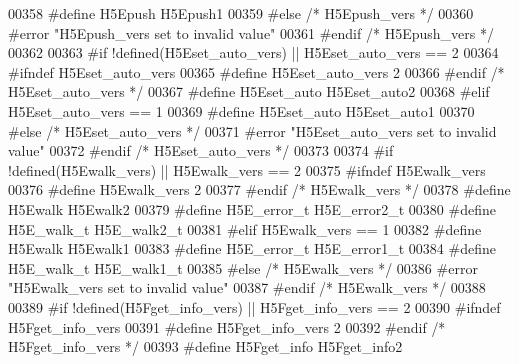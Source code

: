 \begin{DoxyCode}
00358 \textcolor{preprocessor}{  #define H5Epush H5Epush1}
00359 \textcolor{preprocessor}{#else }\textcolor{comment}{/* H5Epush\_vers */}\textcolor{preprocessor}{}
00360 \textcolor{preprocessor}{  #error "H5Epush\_vers set to invalid value"}
00361 \textcolor{preprocessor}{#endif }\textcolor{comment}{/* H5Epush\_vers */}\textcolor{preprocessor}{}
00362 
00363 \textcolor{preprocessor}{#if !defined(H5Eset\_auto\_vers) || H5Eset\_auto\_vers == 2}
00364 \textcolor{preprocessor}{  #ifndef H5Eset\_auto\_vers}
00365 \textcolor{preprocessor}{    #define H5Eset\_auto\_vers 2}
00366 \textcolor{preprocessor}{  #endif }\textcolor{comment}{/* H5Eset\_auto\_vers */}\textcolor{preprocessor}{}
00367 \textcolor{preprocessor}{  #define H5Eset\_auto H5Eset\_auto2}
00368 \textcolor{preprocessor}{#elif H5Eset\_auto\_vers == 1}
00369 \textcolor{preprocessor}{  #define H5Eset\_auto H5Eset\_auto1}
00370 \textcolor{preprocessor}{#else }\textcolor{comment}{/* H5Eset\_auto\_vers */}\textcolor{preprocessor}{}
00371 \textcolor{preprocessor}{  #error "H5Eset\_auto\_vers set to invalid value"}
00372 \textcolor{preprocessor}{#endif }\textcolor{comment}{/* H5Eset\_auto\_vers */}\textcolor{preprocessor}{}
00373 
00374 \textcolor{preprocessor}{#if !defined(H5Ewalk\_vers) || H5Ewalk\_vers == 2}
00375 \textcolor{preprocessor}{  #ifndef H5Ewalk\_vers}
00376 \textcolor{preprocessor}{    #define H5Ewalk\_vers 2}
00377 \textcolor{preprocessor}{  #endif }\textcolor{comment}{/* H5Ewalk\_vers */}\textcolor{preprocessor}{}
00378 \textcolor{preprocessor}{  #define H5Ewalk H5Ewalk2}
00379 \textcolor{preprocessor}{  #define H5E\_error\_t H5E\_error2\_t}
00380 \textcolor{preprocessor}{  #define H5E\_walk\_t H5E\_walk2\_t}
00381 \textcolor{preprocessor}{#elif H5Ewalk\_vers == 1}
00382 \textcolor{preprocessor}{  #define H5Ewalk H5Ewalk1}
00383 \textcolor{preprocessor}{  #define H5E\_error\_t H5E\_error1\_t}
00384 \textcolor{preprocessor}{  #define H5E\_walk\_t H5E\_walk1\_t}
00385 \textcolor{preprocessor}{#else }\textcolor{comment}{/* H5Ewalk\_vers */}\textcolor{preprocessor}{}
00386 \textcolor{preprocessor}{  #error "H5Ewalk\_vers set to invalid value"}
00387 \textcolor{preprocessor}{#endif }\textcolor{comment}{/* H5Ewalk\_vers */}\textcolor{preprocessor}{}
00388 
00389 \textcolor{preprocessor}{#if !defined(H5Fget\_info\_vers) || H5Fget\_info\_vers == 2}
00390 \textcolor{preprocessor}{  #ifndef H5Fget\_info\_vers}
00391 \textcolor{preprocessor}{    #define H5Fget\_info\_vers 2}
00392 \textcolor{preprocessor}{  #endif }\textcolor{comment}{/* H5Fget\_info\_vers */}\textcolor{preprocessor}{}
00393 \textcolor{preprocessor}{  #define H5Fget\_info H5Fget\_info2}

\end{DoxyCode}
